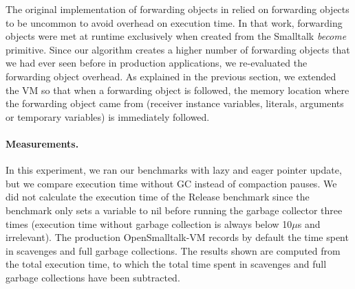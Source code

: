 \documentclass[sigplan,10pt,screen]{acmart}\settopmatter{printfolios=true,printccs=true,printacmref=true}
\newcommand{\egb}[1]{\color{blue}\fbox{\bfseries\sffamily\scriptsize Elisa:}{\sf\small$\blacktriangleright$\textit{#1}$\blacktriangleleft$}\color{black}}
\newcommand{\eem}[1]{\color{olive}\fbox{\bfseries\sffamily\scriptsize Eliot:}{\sf\small$\blacktriangleright$\textit{#1}$\blacktriangleleft$}\color{black}}
\def\OpenSmalltalkVM{OpenSmalltalk-VM\xspace}
\begin{document}
The original implementation of forwarding objects in \cite{Forwarders} relied on forwarding objects to be uncommon to avoid overhead on execution time. In that work, forwarding objects were met at runtime exclusively when created from the Smalltalk \emph{become} primitive. 
Since our algorithm creates a higher number of forwarding objects that we had ever seen before in production applications,
we re-evaluated the forwarding object overhead. 
As explained in the previous section, we extended the VM so that when a forwarding object is followed, the memory location where the forwarding object came from (receiver instance variables, literals, arguments or temporary variables) is immediately followed. 

\paragraph{Measurements.}
In this experiment, we ran our benchmarks with lazy and eager pointer update, but we compare execution time without GC instead of compaction pauses. We did not calculate the execution time of the Release benchmark since the benchmark only sets a variable to nil before running the garbage collector three times (execution time without garbage collection is always below 10$\mu$s and irrelevant). The production \OpenSmalltalkVM records by default the time spent in scavenges and full garbage collections. The results shown are computed from the total execution time, to which the total time spent in scavenges and full garbage collections have been subtracted.
\end{document}
